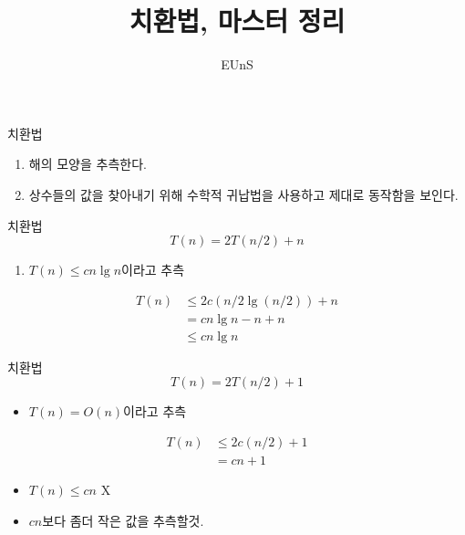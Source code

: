 \documentclass[10pt]{beamer}
\title{치환법, 마스터 정리}
\author{EUnS}
\begin{document}
\begin{frame}{}
    \maketitle
\end{frame}


\begin{frame}{치환법}
    \begin{enumerate}
        \item 해의 모양을 추측한다.
        \item 상수들의 값을 찾아내기 위해 수학적 귀납법을 사용하고 제대로 동작함을 보인다.
    \end{enumerate}
\end{frame}

\begin{frame}{치환법}
    $$T(n) = 2T(n/2) + n$$
    \begin{enumerate}
        \item $T(n) \le cn \lg n$이라고 추측
    \end{enumerate}
    \[
        \begin{aligned}
           T(n) &\le 2c(n/2\lg (n/2)) +n \\
            &= cn\lg n - n + n \\ 
            &\le cn\lg n
        \end{aligned}
    \]
\end{frame}


\begin{frame}{치환법}
    $$T(n) = 2T(n/2) + 1$$
    \begin{itemize}
        \item $T(n) = O(n)$이라고 추측
    \end{itemize}
    \[
        \begin{aligned}
           T(n) &\le 2c(n/2) +1 \\
            &= cn + 1
        \end{aligned}
    \]
    \begin{itemize}
        \item $T(n) \le cn $ X
        \item $cn$보다 좀더 작은 값을 추측할것.
    \end{itemize}

\end{frame}
\end{document}
